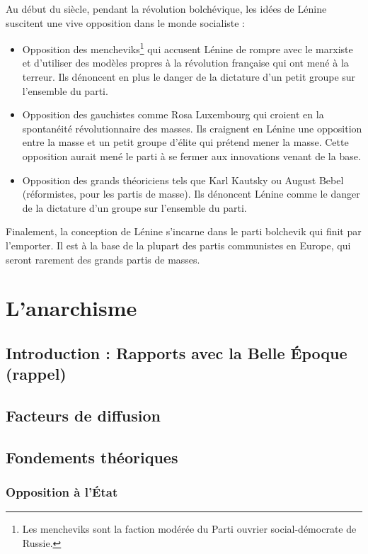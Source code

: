 \documentclass[12pt]{report}
\begin{document}
Au début du siècle, pendant la révolution bolchévique, les idées de Lénine suscitent une vive opposition dans le monde socialiste :
\begin{itemize}
	\item Opposition des mencheviks\footnote{Les mencheviks sont la faction modérée du Parti ouvrier social-démocrate de Russie.} qui accusent Lénine de rompre avec le marxiste et d’utiliser des modèles propres à la révolution française qui ont mené à la terreur. Ils dénoncent en plus le danger de la dictature d'un petit groupe sur l'ensemble du parti.
	\item Opposition des gauchistes comme Rosa Luxembourg qui croient en la spontanéité révolutionnaire des masses. Ils craignent en Lénine une opposition entre la masse et un petit groupe d’élite qui prétend mener la masse. Cette opposition aurait mené le parti à se fermer aux innovations venant de la base.
	\item Opposition des grands théoriciens tels que Karl Kautsky ou August Bebel (réformistes, pour les partis de masse). Ils dénoncent Lénine comme le danger de la dictature d’un groupe sur l’ensemble du parti.
\end{itemize}

Finalement, la conception de Lénine s'incarne dans le parti bolchevik qui finit par l'emporter.
Il est à la base de la plupart des partis communistes en Europe, qui seront rarement des grands partis de masses.

\section{L'anarchisme}

\subsection*{Introduction : Rapports avec la Belle Époque (rappel)}

\subsection{Facteurs de diffusion}

\subsection{Fondements théoriques}

\subsubsection{Opposition à l'État}
\end{document}
